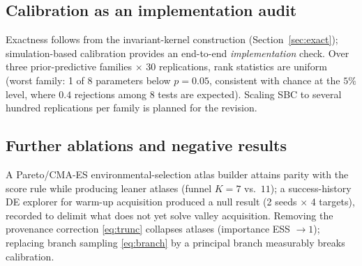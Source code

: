 \documentclass[11pt]{article}
\theoremstyle{remark}
\begin{document}
\subsection{Calibration as an implementation audit}
Exactness follows from the invariant-kernel construction
(Section~\ref{sec:exact}); simulation-based calibration provides an
end-to-end \emph{implementation} check. Over three prior-predictive
families $\times$ 30 replications, rank statistics are uniform (worst
family: 1 of 8 parameters below $p{=}0.05$, consistent with chance at
the $5\%$ level, where $0.4$ rejections among 8 tests are expected).
Scaling
SBC to several hundred replications per family is planned for the
revision.

\subsection{Further ablations and negative results}\label{sec:negative}
A Pareto/CMA-ES environmental-selection atlas builder
\citep{hansen2001,deb2002} attains parity with the score rule while
producing leaner atlases (funnel $K{=}7$ vs.\ $11$); a success-history DE
explorer \citep{tanabe2014} for warm-up acquisition produced a null
result (2 seeds $\times$ 4 targets), recorded to delimit what does not
yet solve valley acquisition. Removing the provenance correction
\eqref{eq:trunc} collapses atlases (importance ESS $\to1$); replacing
branch sampling \eqref{eq:branch} by a principal branch measurably
breaks calibration.
\end{document}
